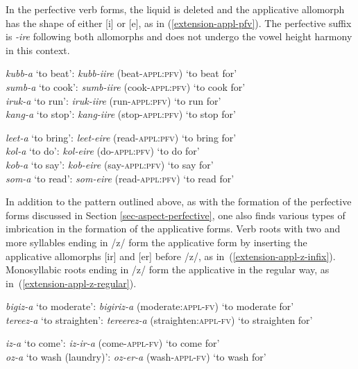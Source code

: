 In the perfective verb forms, the liquid is deleted and the applicative allomorph has the shape of either [i] or [e], as in (\ref{extension-appl-pfv}). 
The perfective suffix is \textit{-ire} following both allomorphs and does not undergo the vowel height harmony in this context.

\ea \label{extension-appl-pfv}
\begin{xlist}
\ex
\textit{kubb-a}	`to beat':	\textit{kubb-iire}  (beat-\textsc{appl}:\textsc{pfv})  `to beat for’\\
\textit{sumb-a}	`to cook':	\textit{sumb-iire}  (cook-\textsc{appl}:\textsc{pfv})  `to cook for’\\
\textit{iruk-a}	 `to run':	 \textit{iruk-iire} (run-\textsc{appl}:\textsc{pfv})  `to run for’\\
\textit{kang-a}	 `to stop':	 \textit{kang-iire}  (stop-\textsc{appl}:\textsc{pfv})  `to stop for’

\ex
\textit{leet-a}	`to bring':	\textit{leet-eire} (read-\textsc{appl}:\textsc{pfv})  `to bring for’\\
\textit{kol-a} `to do': \textit{kol-eire} (do-\textsc{appl}:\textsc{pfv})  `to do for’\\
\textit{kob-a} `to say':  \textit{kob-eire} (say-\textsc{appl}:\textsc{pfv})  `to say for’\\
\textit{som-a} `to read': \textit{som-eire} (read-\textsc{appl}:\textsc{pfv})  `to read for’
\end{xlist}
\z

In addition to the pattern outlined above, as with the formation of the perfective forms discussed in Section \ref{sec-aspect-perfective}, one also finds various types of imbrication in the formation of the applicative forms. 
Verb roots with two and more syllables ending in /z/ form the applicative form by inserting the applicative allomorphs [ir] and [er] before /z/, as in~(\ref{extension-appl-z-infix}). 
Monosyllabic roots ending in /z/ form the applicative in the regular way, as in~(\ref{extension-appl-z-regular}). 

\ea \label{extension-appl-z}
\begin{xlist}

\ex \label{extension-appl-z-infix}
\textit{bigiz-a}	`to moderate': 	\textit{bigiriz-a} (moderate:\textsc{appl}-\textsc{fv}) `to moderate for'\\
\textit{tereez-a}	`to straighten': 	\textit{tereerez-a} (straighten:\textsc{appl}-\textsc{fv}) `to straighten for'

\ex \label{extension-appl-z-regular}
\textit{iz-a}	`to come':  \textit{iz-ir-a} (come-\textsc{appl}-\textsc{fv})  `to come for'\\
\textit{oz-a}	`to wash (laundry)': 	\textit{oz-er-a} (wash-\textsc{appl}-\textsc{fv})  `to wash for'
\end{xlist}
\z

